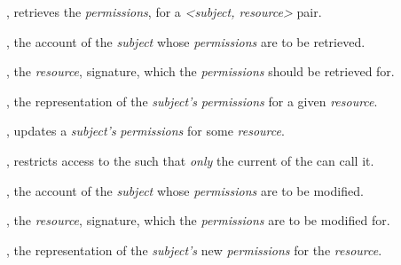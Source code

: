 \begin{code}
\begin{functions}
    \item {},
      retrieves the \emph{permissions}, for a \emph{<subject, resource>} pair.

      \begin{parameters}
        \item {}, the account  of the
          \emph{subject} whose \emph{permissions} are to be retrieved.

        \item {}, the \emph{resource}, 
          signature, which the \emph{permissions} should be retrieved for.
      \end{parameters}

      \begin{returns}
      \item {}, the  representation of the
        \emph{subject's} \emph{permissions} for a given \emph{resource}.
      \end{returns}

    \item {},
      updates a \emph{subject's} \emph{permissions} for some \emph{resource}.

      \begin{modifiers}
        \item {}, restricts access to the
           such that \emph{only} the current  of the
           can call it.
      \end{modifiers}

      \begin{parameters}
        \item {}, the account  of the
          \emph{subject} whose \emph{permissions} are to be modified.

        \item {}, the \emph{resource}, 
          signature, which the \emph{permissions} are to be modified for.

        \item {}, the  representation of
          the \emph{subject's} new \emph{permissions} for the \emph{resource}.
      \end{parameters}


\end{functions}
\end{code}
